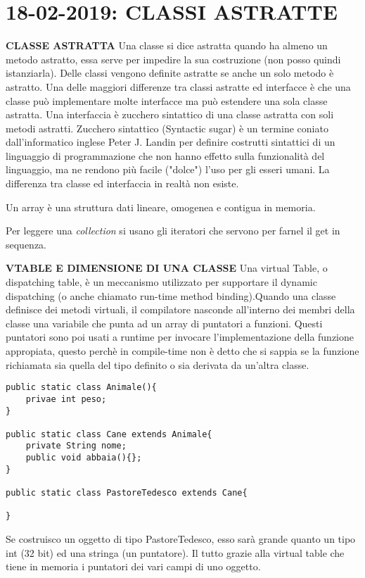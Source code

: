 
\newpage
\section{18-02-2019: CLASSI ASTRATTE}
\textbf{CLASSE ASTRATTA} \newline
Una classe si dice astratta quando ha almeno un metodo astratto, essa serve per impedire la sua costruzione (non posso quindi istanziarla). Delle classi vengono definite astratte se anche un solo metodo è astratto. Una delle maggiori differenze tra classi astratte ed interfacce è che una classe può implementare molte interfacce ma può estendere una sola classe astratta. Una interfaccia è zucchero sintattico di una classe astratta con soli metodi astratti. Zucchero sintattico (Syntactic sugar) è un termine coniato dall'informatico inglese Peter J. Landin per definire costrutti sintattici di un linguaggio di programmazione che non hanno effetto sulla funzionalità del linguaggio, ma ne rendono più facile ("dolce") l'uso per gli esseri umani. La differenza tra classe ed interfaccia in realtà non esiste.

\noindent Un array è una struttura dati lineare, omogenea e contigua in memoria.

\noindent Per leggere una \textit{collection} si usano gli iteratori che servono per farnel il get in sequenza.

\noindent \textbf{VTABLE E DIMENSIONE DI UNA CLASSE} \newline
Una virtual Table, o dispatching table, è un meccanismo utilizzato per supportare il dynamic dispatching (o anche chiamato run-time method binding).Quando una classe definisce dei metodi virtuali, il compilatore nasconde all'interno dei membri della classe una variabile che punta ad un array di puntatori a funzioni. Questi puntatori sono poi usati a runtime per invocare l'implementazione della funzione appropiata, questo perchè in compile-time non è detto che si sappia se la funzione richiamata sia quella del tipo definito o sia derivata da un'altra classe.

\begin{lstlisting}[basicstyle=\small,]
public static class Animale(){
	privae int peso;
}

public static class Cane extends Animale{
	private String nome;
	public void abbaia(){};
}

public static class PastoreTedesco extends Cane{

}
\end{lstlisting}
Se costruisco un oggetto di tipo PastoreTedesco, esso sarà grande quanto un tipo int (32 bit) ed una stringa (un puntatore).
Il tutto grazie alla virtual table che tiene in memoria i puntatori dei vari campi di uno oggetto.






